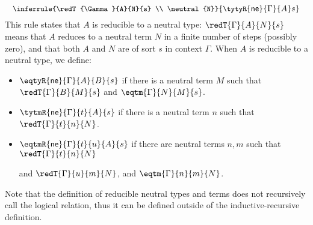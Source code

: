\[
{\small
  \inferrule{\redT{\Gamma}{A}{N}{s} \\ \neutral{N}}
  {\tytyR{\mathsf{ne}}{\Gamma}{A}s{}}
  }
\]
This rule states that $A$ is reducible to a neutral type:
\( \redT{\Gamma}{A}{N}{s} \) means that \( A \) reduces to a neutral term \( N \)
in a finite number of steps (possibly zero), and that both \( A \) and \( N \) are of sort \( s \) in context \( \Gamma \).
%
When $A$ is reducible to a neutral type, we define:
\begin{itemize}
  \item \( \eqtyR{\mathsf{ne}}{\Gamma}{A}{B}{s} \) if there is a neutral term \( M \) such that
    \( \redT{\Gamma}{B}{M}{s} \) and \( \eqtm{\Gamma}{N}{M}{s} \).
  \item \( \tytmR{\mathsf{ne}}{\Gamma}{t}{A}{s} \) if there is a neutral term \( n \) such that
    \( \redT{\Gamma}{t}{n}{N} \).
  \item \( \eqtmR{\mathsf{ne}}{\Gamma}{t}{u}{A}{s} \) if there are neutral terms \( n, m \) such that
    \( \redT{\Gamma}{t}{n}{N} \)

    and \( \redT{\Gamma}{u}{m}{N} \), and
    \( \eqtm{\Gamma}{n}{m}{N} \).
\end{itemize}

Note that the definition of reducible neutral types and terms does not
recursively call the logical relation, thus it can be defined outside of
the inductive-recursive definition.

